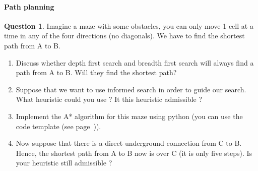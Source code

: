 \documentclass[11pt,a4paper]{article}
\theoremstyle{definition}%
\newtheorem{Q}{Question}[] %
\begin{document}
\paragraph{Path planning}
\begin{Q}
    Imagine a maze with some obstacles, you can only move 1 cell at a time in any of 
    the four directions (no diagonals). We have to find the shortest path from A to B.
\begin{enumerate}
    \item Discuss whether depth first search and breadth first search will always find a path from
    A to B. Will they find the shortest path?
    \item Suppose that we want to use informed search in order to guide our search. 
        What heuristic could you use ? It this heuristic admissible ?
    \item Implement the A* algorithm for this maze using python (you can use the code template (see page~\pageref{source})).
    \item Now suppose that there is a direct underground connection from C to B. Hence, the
    shortest path from A to B now is over C (it is only five steps). Is your heuristic still admissible ?
\end{enumerate}



\end{Q}
\end{document}

